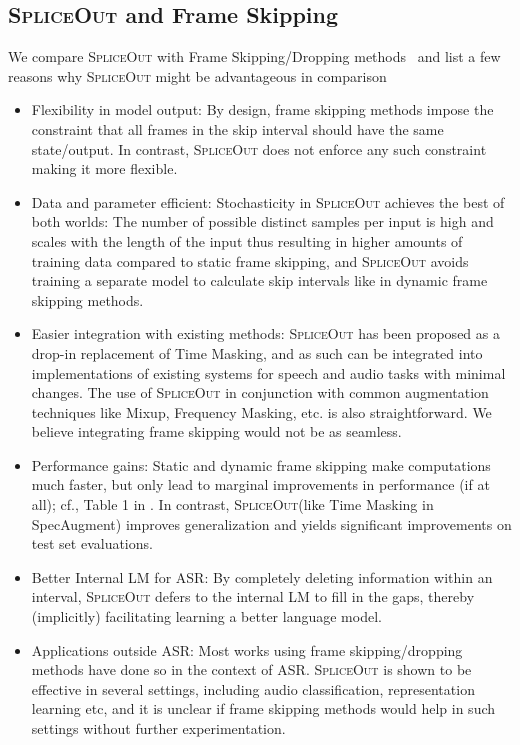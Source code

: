 \documentclass{article}
\newcommand{\SpA}{{\textsc{SpliceOut}}\xspace}
\begin{document}
\subsection{\SpA and Frame Skipping}
\label{app:frameskipping}
We compare \SpA with Frame Skipping/Dropping methods~\cite{dynamicframeskipping,45555,7472084,6639137} and list a few reasons why \SpA might be advantageous in comparison
\begin{itemize}
    \item Flexibility in model output: By design, frame skipping methods impose the constraint that all frames in the skip interval should have the same state/output. In contrast, \SpA does not enforce any such constraint making it more flexible.
    \item Data and parameter efficient: Stochasticity in \SpA achieves the best of both worlds: The number of possible distinct samples per input is high and scales with the length of the input thus resulting in higher amounts of training data compared to static frame skipping, and \SpA avoids training a separate model to calculate skip intervals like in dynamic frame skipping methods.  
    \item Easier integration with existing methods: \SpA has been proposed as a drop-in replacement of Time Masking, and as such can be integrated into implementations of existing systems for speech and audio tasks with minimal changes. The use of \SpA in conjunction with common augmentation techniques like Mixup, Frequency Masking, etc. is also straightforward. We believe integrating frame skipping would not be as seamless. 
    \item Performance gains: Static and dynamic frame skipping make computations much faster, but only lead to marginal improvements in performance (if at all); cf., Table 1 in \cite{dynamicframeskipping}. In contrast, \SpA (like Time Masking in SpecAugment) improves generalization and yields significant improvements on test set evaluations.
    \item Better Internal LM for ASR: By completely deleting information within an interval, \SpA defers to the internal LM to fill in the gaps, thereby (implicitly) facilitating learning a better language model. 
    \item Applications outside ASR: Most works using frame skipping/dropping methods have done so in the context of ASR. \SpA is shown to be effective in several settings, including audio classification, representation learning etc, and it is unclear if frame skipping methods would help in such settings without further experimentation. 
\end{itemize}



{\small }
\end{document}
